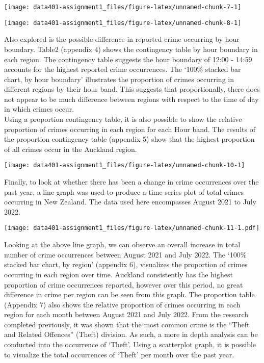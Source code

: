 \documentclass[
  10pt,
]{article}
\begin{document}
\begin{center}\texttt{[image: data401-assignment1\_files/figure-latex/unnamed-chunk-7-1]} \end{center}

\begin{center}\texttt{[image: data401-assignment1\_files/figure-latex/unnamed-chunk-8-1]} \end{center}

Also explored is the possible difference in reported crime occurring by
hour boundary. Table2 (appendix 4) shows the contingency table by hour
boundary in each region. The contingency table suggests the hour
boundary of 12:00 - 14:59 accounts for the highest reported crime
occurrences. The `100\% stacked bar chart, by hour boundary' illustrates
the proportion of crimes occurring in different regions by their hour
band. This suggests that proportionally, there does not appear to be
much difference between regions with respect to the time of day in which
crimes occur.\\
Using a proportion contingency table, it is also possible to show the
relative proportion of crimes occurring in each region for each Hour
band. The results of the proportion contingency table (appendix 5) show
that the highest proportion of all crimes occur in the Auckland region.

\begin{center}\texttt{[image: data401-assignment1\_files/figure-latex/unnamed-chunk-10-1]} \end{center}

Finally, to look at whether there has been a change in crime occurrences
over the past year, a line graph was used to produce a time series plot
of total crimes occurring in New Zealand. The data used here encompasses
August 2021 to July 2022.

\texttt{[image: data401-assignment1\_files/figure-latex/unnamed-chunk-11-1.pdf]}

Looking at the above line graph, we can observe an overall increase in
total number of crime occurrences between August 2021 and July 2022. The
`100\% stacked bar chart, by region' (appendix 6), visualizes the
proportion of crimes occurring in each region over time. Auckland
consistently has the highest proportion of crime occurrences reported,
however over this period, no great difference in crime per region can be
seen from this graph. The proportion table (Appendix 7) also shows the
relative proportion of crimes occurring in each region for each month
between August 2021 and July 2022. From the research completed
previously, it was shown that the most common crime is the ``Theft and
Related Offences'' (Theft) division. As such, a more in depth analysis
can be conducted into the occurrence of `Theft'. Using a scatterplot
graph, it is possible to visualize the total occurrences of `Theft' per
month over the past year.
\end{document}
